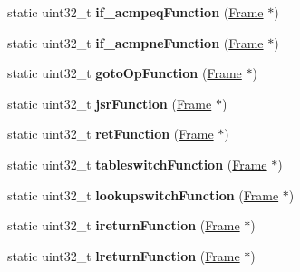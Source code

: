 \begin{DoxyCompactItemize}
\item 
static uint32\+\_\+t {\bfseries if\+\_\+acmpeq\+Function} (\hyperlink{classFrame}{Frame} $\ast$)\hypertarget{classInstruction_abc13606387b607da7ab2eec650ab8179}{}\label{classInstruction_abc13606387b607da7ab2eec650ab8179}

\item 
static uint32\+\_\+t {\bfseries if\+\_\+acmpne\+Function} (\hyperlink{classFrame}{Frame} $\ast$)\hypertarget{classInstruction_a070eeeda2a85f243bb9493212f3c22e9}{}\label{classInstruction_a070eeeda2a85f243bb9493212f3c22e9}

\item 
static uint32\+\_\+t {\bfseries goto\+Op\+Function} (\hyperlink{classFrame}{Frame} $\ast$)\hypertarget{classInstruction_ac7f651c378b963e375a2cd48dc7415ed}{}\label{classInstruction_ac7f651c378b963e375a2cd48dc7415ed}

\item 
static uint32\+\_\+t {\bfseries jsr\+Function} (\hyperlink{classFrame}{Frame} $\ast$)\hypertarget{classInstruction_a3e17d3e890b5273a48b4dc3de50c7dd6}{}\label{classInstruction_a3e17d3e890b5273a48b4dc3de50c7dd6}

\item 
static uint32\+\_\+t {\bfseries ret\+Function} (\hyperlink{classFrame}{Frame} $\ast$)\hypertarget{classInstruction_aaee7d55fd76d70277564195b3185195c}{}\label{classInstruction_aaee7d55fd76d70277564195b3185195c}

\item 
static uint32\+\_\+t {\bfseries tableswitch\+Function} (\hyperlink{classFrame}{Frame} $\ast$)\hypertarget{classInstruction_a3d27710449028264b44616392f10d1fe}{}\label{classInstruction_a3d27710449028264b44616392f10d1fe}

\item 
static uint32\+\_\+t {\bfseries lookupswitch\+Function} (\hyperlink{classFrame}{Frame} $\ast$)\hypertarget{classInstruction_a34baa85bf6cf23cc7223666541cf0697}{}\label{classInstruction_a34baa85bf6cf23cc7223666541cf0697}

\item 
static uint32\+\_\+t {\bfseries ireturn\+Function} (\hyperlink{classFrame}{Frame} $\ast$)\hypertarget{classInstruction_ad8a7704a45b0ece25e77ba5996ab2e23}{}\label{classInstruction_ad8a7704a45b0ece25e77ba5996ab2e23}

\item 
static uint32\+\_\+t {\bfseries lreturn\+Function} (\hyperlink{classFrame}{Frame} $\ast$)\hypertarget{classInstruction_aa4e8a30d9a22e9809deeb07e1bca7e85}{}\label{classInstruction_aa4e8a30d9a22e9809deeb07e1bca7e85}


\end{DoxyCompactItemize}
